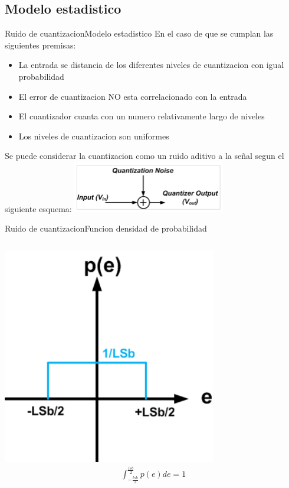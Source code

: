       \subsection{Modelo estadistico}
      \begin{frame}{Ruido de cuantizacion}{Modelo estadistico}
         En el caso de que se cumplan las siguientes premisas:
         \begin{itemize}
                \item La entrada se distancia de los diferentes niveles de cuantizacion con igual probabilidad
                \item El error de cuantizacion NO esta correlacionado con la entrada
                \item El cuantizador cuanta con un numero relativamente largo de niveles
                \item Los niveles de cuantizacion son uniformes
         \end{itemize}
            Se puede considerar la cuantizacion como un ruido aditivo a la señal segun el siguiente esquema:
      \center\includegraphics[width=0.5\textwidth]{1_clase/noise_model}
      \vfill
   \end{frame}
   \begin{frame}{Ruido de cuantizacion}{Funcion densidad de probabilidad}
      \begin{columns}[onlytextwidth]
         \center\includegraphics[width=0.7\textwidth]{1_clase/noise_funcion_probabilidad}
         \begin{align*}
            \int^\frac{lsb}{2}_{-\frac{lsb}{2}} p(e) de = 1 \\
         \end{align*}
      \end{columns}
      \vfill
   \end{frame}
